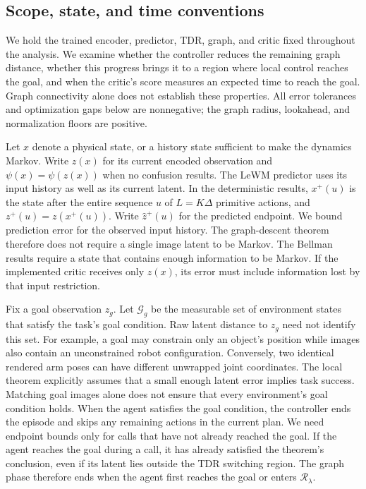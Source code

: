 \documentclass{article} %
\newcommand{\Rset}{\mathcal R_\lambda}
\theoremstyle{definition}
\theoremstyle{remark}
\begin{document}
\subsection{Scope, state, and time conventions}
\label{app:theory-setup}
We hold the trained encoder, predictor, TDR, graph, and critic fixed throughout the analysis.
We examine whether the controller reduces the remaining graph distance, whether this
progress brings it to a region where local control reaches the goal, and when the
critic's score measures an expected time to reach the goal.
Graph connectivity alone does not establish these properties.
All error tolerances and optimization gaps below are nonnegative; the graph radius,
lookahead, and normalization floors are positive.

Let $x$ denote a physical state, or a history state sufficient to make the dynamics
Markov. Write $z(x)$ for its current encoded observation and
$\psi(x)=\psi(z(x))$ when no confusion results. The LeWM predictor uses
its input history as well as its current latent. In the deterministic results,
$x^+(u)$ is the state after the entire sequence $u$ of $L=K\Delta$ primitive actions,
and $z^+(u)=z(x^+(u))$. Write $\hat z^+(u)$ for the predicted endpoint.
We bound prediction error for the observed input history.
The graph-descent theorem therefore does not require a single image latent to be Markov.
The Bellman results require a state that contains enough information to be Markov.
If the implemented critic receives only $z(x)$, its error must include information lost
by that input restriction.

Fix a goal observation $z_g$. Let $\mathcal G_g$ be the measurable set of environment
states that satisfy the task's goal condition. Raw latent distance to $z_g$ need not identify this set.
For example, a goal may constrain only an object's position while images also contain
an unconstrained robot configuration. Conversely, two identical rendered arm poses can
have different unwrapped joint coordinates. The local theorem explicitly assumes that a
small enough latent error implies task success. Matching goal images alone does not
ensure that every environment's goal condition holds.
When the agent satisfies the goal condition, the controller ends the episode and skips
any remaining actions in the current plan.
We need endpoint bounds only for calls that have not already reached the goal.
If the agent reaches the goal during a call, it has already satisfied the theorem's
conclusion, even if its latent lies outside the TDR switching region.
The graph phase therefore ends when the agent first reaches the goal or enters $\Rset$.
\end{document}
